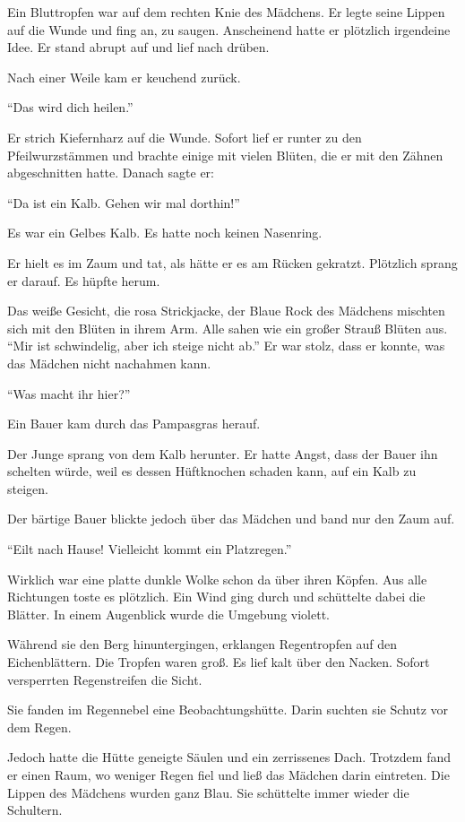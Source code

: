 \documentclass[prd,12pt,tightenlines,notitlepage,nofootinbib]{revtex4-1}
\begin{document}
Ein Bluttropfen war auf
dem rechten Knie des Mädchens.  Er legte seine Lippen auf die Wunde und fing an,
zu saugen.  Anscheinend hatte er plötzlich irgendeine Idee.  Er stand abrupt auf
und lief nach drüben.

Nach einer Weile kam er keuchend zurück.

"`Das wird dich heilen."'

Er strich Kiefernharz auf die Wunde.  Sofort
lief er runter zu den Pfeilwurzstämmen und brachte einige mit vielen
Blüten, die er mit den Zähnen abgeschnitten hatte.  Danach sagte er:

"`Da ist ein Kalb. Gehen wir mal dorthin!"'

Es war ein Gelbes Kalb.  Es hatte noch keinen
Nasenring.

Er hielt es im Zaum und tat, als hätte er es am Rücken
gekratzt.  Plötzlich sprang er darauf.  Es hüpfte herum.

Das weiße Gesicht, die rosa Strickjacke, der Blaue Rock des
Mädchens mischten sich mit den Blüten in ihrem Arm.  Alle sahen wie
ein großer Strauß Blüten aus.  "`Mir ist schwindelig, aber ich steige nicht
ab."'  Er war stolz, dass er konnte, was das Mädchen nicht nachahmen kann.

"`Was macht ihr hier?"'

Ein Bauer kam durch das Pampasgras herauf.

Der
Junge sprang von dem Kalb herunter.  Er hatte Angst, dass der Bauer ihn schelten
würde, weil es dessen Hüftknochen schaden kann, auf ein Kalb zu steigen.

Der
bärtige Bauer blickte jedoch über das Mädchen und band nur den Zaum
auf.

"`Eilt nach Hause!  Vielleicht kommt ein Platzregen."'

Wirklich
war eine platte dunkle Wolke schon da über ihren Köpfen. Aus alle
Richtungen toste es plötzlich.  Ein Wind ging durch und
schüttelte dabei die Blätter.  In einem Augenblick wurde die Umgebung violett.

Während sie den Berg hinuntergingen, erklangen Regentropfen
auf den Eichenblättern.
Die Tropfen waren groß.  Es lief kalt über den Nacken. %
Sofort versperrten Regenstreifen die Sicht.

Sie fanden im
Regennebel eine Beobachtungshütte.  Darin suchten sie Schutz vor dem Regen.

Jedoch hatte die Hütte geneigte Säulen und ein zerrissenes
Dach.  Trotzdem fand er einen Raum, wo weniger Regen fiel und ließ das Mädchen
darin eintreten.  Die Lippen des Mädchens wurden ganz Blau.
Sie schüttelte immer wieder die Schultern.
\end{document}
